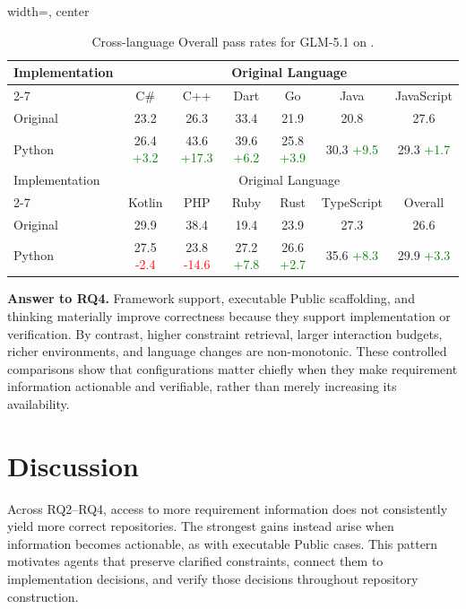\begin{table}[t]
\centering
\caption{Cross-language Overall pass rates for GLM-5.1 on \rcb{}.}
\label{tab:cross-language-glm51}
\small
\begin{adjustbox}{width=\linewidth, center}
\begin{tabular}{lcccccc}
\toprule
Implementation & \multicolumn{6}{c}{Original Language} \\
\cmidrule(lr){2-7}
 & C\# & C++ & Dart & Go & Java & JavaScript \\
\midrule
Original & 23.2 & 26.3 & 33.4 & 21.9 & 20.8 & 27.6 \\
Python & 26.4 \textcolor{green}{+3.2} & 43.6 \textcolor{green}{+17.3} & 39.6 \textcolor{green}{+6.2} & 25.8 \textcolor{green}{+3.9} & 30.3 \textcolor{green}{+9.5} & 29.3 \textcolor{green}{+1.7} \\
\midrule
Implementation & \multicolumn{6}{c}{Original Language} \\
\cmidrule(lr){2-7}
 & Kotlin & PHP & Ruby & Rust & TypeScript & Overall \\
\midrule
Original & 29.9 & 38.4 & 19.4 & 23.9 & 27.3 & 26.6 \\
Python & 27.5 \textcolor{red}{-2.4} & 23.8 \textcolor{red}{-14.6} & 27.2 \textcolor{green}{+7.8} & 26.6 \textcolor{green}{+2.7} & 35.6 \textcolor{green}{+8.3} & 29.9 \textcolor{green}{+3.3} \\
\bottomrule
\end{tabular}
\end{adjustbox}
\end{table}

\textbf{Answer to RQ4.} Framework support, executable Public scaffolding, and thinking materially improve correctness because they support implementation or verification. By contrast, higher constraint retrieval, larger interaction budgets, richer environments, and language changes are non-monotonic. These controlled comparisons show that configurations matter chiefly when they make requirement information actionable and verifiable, rather than merely increasing its availability.


\section{Discussion}
\label{sec:discussion}
Across RQ2--RQ4, access to more requirement information does not consistently yield more correct repositories. The strongest gains instead arise when information becomes actionable, as with executable Public cases. This pattern motivates agents that preserve clarified constraints, connect them to implementation decisions, and verify those decisions throughout repository construction.

